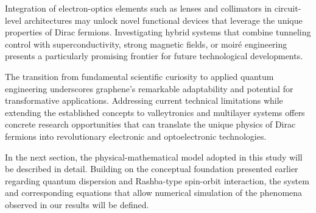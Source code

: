 Integration of electron-optics elements such as lenses and collimators in circuit-level architectures may unlock novel functional devices that leverage the unique properties of Dirac fermions.
Investigating hybrid systems that combine tunneling control with superconductivity, strong magnetic fields, or moiré engineering presents a particularly promising frontier for future technological developments.

The transition from fundamental scientific curiosity to applied quantum engineering underscores graphene's remarkable adaptability and potential for transformative applications.
Addressing current technical limitations while extending the established concepts to valleytronics and multilayer systems offers concrete research opportunities that can translate the unique physics of Dirac fermions into revolutionary electronic and optoelectronic technologies.

In the next section, the physical-mathematical model adopted in this study will be described in detail.
Building on the conceptual foundation presented earlier regarding quantum dispersion and Rashba-type spin-orbit interaction, the system and corresponding equations that allow numerical simulation of the phenomena observed in our results will be defined.

